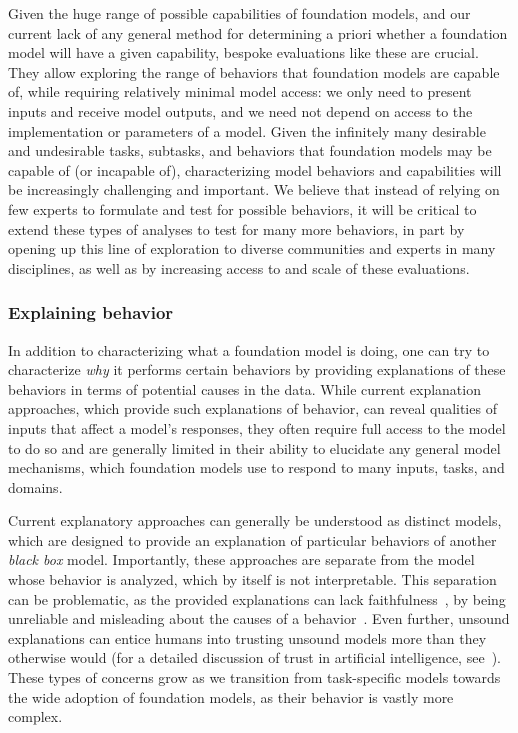 Given the huge range of possible capabilities of foundation models, and our current lack of any general method for determining a priori whether a foundation model will have a given capability, bespoke evaluations like these are crucial.
They allow exploring the range of behaviors that foundation models are capable of, while requiring relatively minimal model access: we only need to present inputs and receive model outputs, and we need not depend on access to the implementation or parameters of a model.
Given the infinitely many desirable and undesirable tasks, subtasks, and behaviors that foundation models may be capable of (or incapable of), characterizing model behaviors and capabilities will be increasingly challenging and important.
We believe that instead of relying on few experts to formulate and test for possible behaviors, it will be critical to extend these types of analyses to test for many more behaviors, in part by opening up this line of exploration to diverse communities and experts in many disciplines, as well as by increasing access to and scale of these evaluations.


\subsubsection{Explaining behavior}

In addition to characterizing what a foundation model is doing, one can try to characterize \textit{why} it performs certain behaviors by providing explanations of these behaviors in terms of potential causes in the data.
While current explanation approaches, which provide such explanations of behavior, can reveal qualities of inputs that affect a model's responses, they often require full access to the model to do so and are generally limited in their ability to elucidate any general model mechanisms, which foundation models use to respond to many inputs, tasks, and domains.

Current explanatory approaches can generally be understood as distinct models, which are designed to provide an explanation of particular behaviors of another \textit{black box} model. 
Importantly, these approaches are separate from the model whose behavior is analyzed, which by itself is not interpretable.
This separation can be problematic, as the provided explanations can lack faithfulness~\citep{jacovi2020towards}, by being unreliable and misleading about the causes of a behavior~\citep[c.f.,][]{rudin2019stop}.
Even further, unsound explanations can entice humans into trusting unsound models more than they otherwise would (for a detailed discussion of trust in artificial intelligence, see~\citet{jacovi2021formalizing}).
These types of concerns grow as we transition from task-specific models towards the wide adoption of foundation models, as their behavior is vastly more complex.

